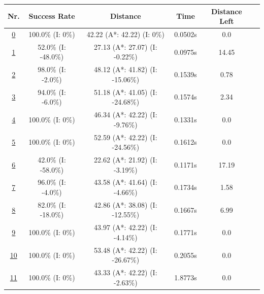 \begin{table}[h!] 
\footnotesize
\centering


\begin{tabular}{|cc|c|c|c|c|c|}
\hline
\multicolumn{2}{|c|}{\textbf{Nr.}} & \textbf{Success Rate} & \textbf{Distance} & \textbf{Time} & \textbf{Distance Left}\\
\hline
\hline
\multicolumn{2}{|c|}{\cellcolor{lightgray!20} \hyperref[tab: evalalgorithms]{0}} & 100.0\% (I: 0\%) & 42.22 (A*: 42.22) (I: 0\%) & 0.0502s & 0.0\\
\hline
\hline
\multicolumn{2}{|c|}{\cellcolor{red!40} \hyperref[tab: evalalgorithms]{1}} & 52.0\% (I: -48.0\%) & 27.13 (A*: 27.07) (I: -0.22\%) & 0.0975s & 14.45\\
\hline
\multicolumn{2}{|c|}{\cellcolor{red!20} \hyperref[tab: evalalgorithms]{2}} & 98.0\% (I: -2.0\%) & 48.12 (A*: 41.82) (I: -15.06\%) & 0.1539s & 0.78\\
\hline
\multicolumn{2}{|c|}{\cellcolor{red!20} \hyperref[tab: evalalgorithms]{3}} & 94.0\% (I: -6.0\%) & 51.18 (A*: 41.05) (I: -24.68\%) & 0.1574s & 2.34\\
\hline
\multicolumn{2}{|c|}{\cellcolor{red!20} \hyperref[tab: evalalgorithms]{4}} & 100.0\% (I: 0\%) & 46.34 (A*: 42.22) (I: -9.76\%) & 0.1331s & 0.0\\
\hline
\multicolumn{2}{|c|}{\cellcolor{red!20} \hyperref[tab: evalalgorithms]{5}} & 100.0\% (I: 0\%) & 52.59 (A*: 42.22) (I: -24.56\%) & 0.1612s & 0.0\\
\hline
\hline
\multicolumn{2}{|c|}{\cellcolor{blue!20} \hyperref[tab: evalalgorithms]{6}} & 42.0\% (I: -58.0\%) & 22.62 (A*: 21.92) (I: -3.19\%) & 0.1171s & 17.19\\
\hline
\multicolumn{2}{|c|}{\cellcolor{blue!40} \hyperref[tab: evalalgorithms]{7}} & 96.0\% (I: -4.0\%) & 43.58 (A*: 41.64) (I: -4.66\%) & 0.1734s & 1.58\\
\hline
\multicolumn{2}{|c|}{\cellcolor{blue!20} \hyperref[tab: evalalgorithms]{8}} & 82.0\% (I: -18.0\%) & 42.86 (A*: 38.08) (I: -12.55\%) & 0.1667s & 6.99\\
\hline
\multicolumn{2}{|c|}{\cellcolor{blue!20} \hyperref[tab: evalalgorithms]{9}} & 100.0\% (I: 0\%) & 43.97 (A*: 42.22) (I: -4.14\%) & 0.1771s & 0.0\\
\hline
\multicolumn{2}{|c|}{\cellcolor{blue!20} \hyperref[tab: evalalgorithms]{10}} & 100.0\% (I: 0\%) & 53.48 (A*: 42.22) (I: -26.67\%) & 0.2055s & 0.0\\
\hline
\hline
\multicolumn{2}{|c|}{\cellcolor{orange!40} \hyperref[tab: evalalgorithms]{11}} & 100.0\% (I: 0\%) & 43.33 (A*: 42.22) (I: -2.63\%) & 1.8773s & 0.0\\

\end{tabular}
\end{table}
